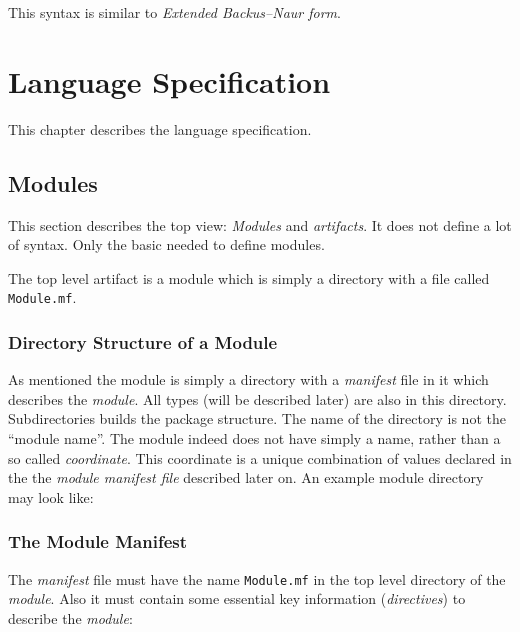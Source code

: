\documentclass[11pt,a4paper]{report}
\begin{document}
This syntax is similar to \textit{Extended Backus–Naur form}\cite{ebnf-wiki}.

\chapter{Language Specification}

This chapter describes the language specification.

\section{Modules}

This section describes the top view: \textit{Modules} and \textit{artifacts}. It does not define a lot of syntax. Only the basic needed to define modules.

The top level artifact is a module which is simply a directory with a file called \texttt{Module.mf}.

\subsection{Directory Structure of a Module}

As mentioned the module is simply a directory with a \textit{manifest} file in it which describes the \textit{module}. All types (will be described later) are also in this directory. Subdirectories builds the package structure. The name of the directory is not the ``module name''. The module indeed does not have simply a name, rather than a so called \textit{coordinate}. This coordinate is a unique combination of values declared in the the \textit{module manifest file} described later on. An example module directory may look like:
\\

\subsection{The Module Manifest}

The \textit{manifest} file must have the name \texttt{Module.mf} in the top level directory of the \textit{module}. Also it must contain some essential key information (\textit{directives}) to describe the \textit{module}:
\end{document}
